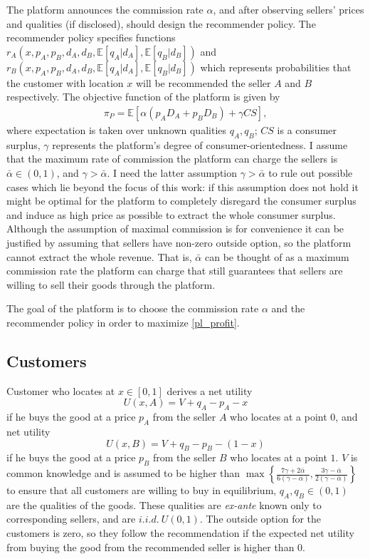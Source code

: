 \documentclass[a4paper]{article}
\begin{document}
The platform announces the commission rate $\alpha$, and after observing sellers' prices and qualities (if disclosed), should design the recommender policy. The recommender policy specifies functions $r_A(x, p_A, p_B, d_A, d_B, \mathbb{E}[q_A|d_A], \mathbb{E}[q_B|d_B])$ and \newline
$r_B(x, p_A, p_B, d_A, d_B, \mathbb{E}[q_A|d_A], \mathbb{E}[q_B|d_B])$ which represents probabilities that the customer with location $x$ will be recommended the seller $A$ and $B$ respectively. The objective function of the platform is given by \begin{align}\label{pl_profit}
\pi_P = \mathbb{E}\left[\alpha(p_A D_A + p_B D_B) + \gamma CS\right],
\end{align}
where expectation is taken over unknown qualities $q_A, q_B$; $CS$ is a consumer surplus, $\gamma$ represents the platform's degree of consumer-orientedness. I assume that the maximum rate of commission the platform can charge the sellers is $\bar{\alpha} \in (0, 1)$, and $\gamma > \bar{\alpha}$. I need the latter assumption $\gamma > \bar{\alpha}$ to rule out possible cases which lie beyond the focus of this work: if this assumption does not hold it might be optimal for the platform to completely disregard the consumer surplus and induce as high price as possible to extract the whole consumer surplus. Although the assumption of maximal commission is for convenience it can be justified by assuming that sellers have non-zero outside option, so the platform cannot extract the whole revenue. That is, $\bar{\alpha}$ can be thought of as a maximum commission rate the platform can charge that still guarantees that sellers are willing to sell their goods through the platform.


The goal of the platform is to choose the commission rate $\alpha$ and the recommender policy in order to maximize \eqref{pl_profit}.
	
	
	\subsection{Customers}
Customer who locates at $x \in [0, 1]$ derives a net utility $$U(x, A) =  V + q_A - p_A - x$$ if  he buys the good at a price $p_A$ from the seller $A$ who locates at a point $0$, and net utility $$U(x, B) = V + q_B - p_B - (1-x)$$ if  he buys the good at a price $p_B$ from the seller $B$ who locates at a point $1$. $V$ is common knowledge and is assumed to be higher than $\max \left\{\frac{7\gamma + 2\bar{\alpha}}{6(\gamma - \bar{\alpha})},  \frac{3 \gamma - \bar{\alpha}}{2(\gamma - \bar{\alpha})} \right\}$ to ensure that all customers are willing to buy in equilibrium, $q_A, q_B \in (0, 1)$ are the qualities of the goods. These qualities are \textit{ex-ante} known only to corresponding sellers, and are $i.i.d.\  U(0, 1)$. The outside option for the customers is zero, so they follow the recommendation if the expected net utility from buying the good from the recommended seller is higher than 0.
\end{document}
